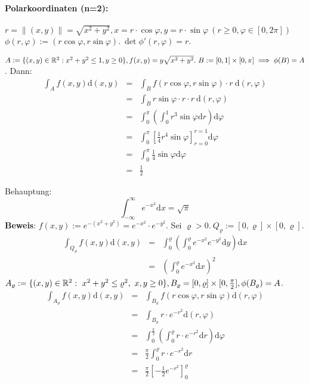 \documentclass{article}
\begin{document}
\paragraph{Polarkoordinaten (n=2):} $ $\\
$r=\|(x,y)\|=\sqrt{x^2+y^2}, x=r\cdot\cos\varphi, y=r\cdot\sin\varphi\ (r\ge 0, \varphi\in[0,2\pi])$\\
$\phi(r,\varphi):=(r\cos\varphi, r\sin\varphi).\ \det \phi'(r,\varphi)=r$.
\begin{beispiele}
\item $A:=\{(x,y)\in\mathbb{R}^2:x^2+y^2\le1, y\ge 0\}, f(x,y)=y\sqrt{x^2+y^2}.\ B:=[0,1]\times[0,\pi]\implies\phi(B)=A$.
Dann:
\begin{eqnarray*}
\int_Af(x,y)\text{d}(x,y)&=&\int_Bf(r\cos\varphi,r\sin\varphi)\cdot r\ \text{d}(r,\varphi)\\
&=&\int_Br\sin\varphi\cdot r\cdot r\ \text{d}(r,\varphi)\\
&=&\int_0^\pi(\int_0^1 r^3\sin\varphi\text{d}r)\text{d}\varphi\\
&=&\int_0^\pi\left[\frac{1}{4}r^4\sin\varphi\right]_{r=0}^{r=1}\text{d}\varphi\\
&=&\int_0^\pi\frac{1}{4}\sin\varphi\text{d}\varphi\\
&=&\frac{1}{2}
\end{eqnarray*}
\item Behauptung:
\[
	\int_{-\infty}^\infty e^{-x^2}\text{d}x=\sqrt{\pi}
\]
\textbf{Beweis}: $f(x,y):=e^{-(x^2+y^2)}=e^{-x^2}\cdot e^{-y^2}$. Sei $\varrho>0.\ Q_\varrho:=[0,\varrho]\times[0,\varrho]$.
\begin{eqnarray*}
\int_{Q_\varrho}f(x,y)\text{d}(x,y)&=&\int_0^\varrho(\int_0^\varrho e^{-x^2}e^{-y^2}\text{d}y)\text{d}x\\
&=&(\int_0^\varrho e^{-x^2}\text{d}x)^2
\end{eqnarray*}
$A_{\varrho}:=\{(x,y)\in\MdR^2:\ x^2+y^2\le\varrho^2,\ x,y\ge 0\}, B_{\varrho}=[0,\varrho]\times[0,\frac{\pi}{2}], \phi(B_{\varrho})=A$.
\begin{eqnarray*}
\int_{A_\varrho}f(x,y)\text{d}(x,y)&=&\int_{B_\varrho}f(r\cos\varphi,r\sin\varphi)\text{d}(r,\varphi)\\
&=&\int_{B_\varrho}r\cdot e^{-r^2}\text{d}(r,\varphi)\\
&=&\int_0^{\frac{\pi}{2}}(\int_0^\varrho r\cdot e^{-r^2}\text{d}r)\text{d}\varphi\\
&=&\frac{\pi}{2}\int_0^{\varrho}r\cdot e^{-r^2}\text{d}r\\
&=&\frac{\pi}{2}\left[-\frac{1}{2}e^{-r^2}\right]_0^{\varrho}\\

\end{eqnarray*}
\end{beispiele}
\end{document}
